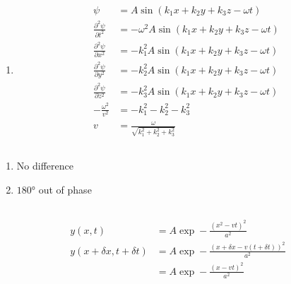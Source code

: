 \documentclass{article}
\begin{document}
\begin{enumerate}
  \item

        \begin{align*}
          \psi                                 & = A \sin (k_1 x + k_2 y + k_3 z - \omega t)           \\
          \frac{\partial^2 \psi}{\partial t^2} & = -\omega^2 A \sin (k_1 x + k_2 y + k_3 z - \omega t) \\
          \frac{\partial^2 \psi}{\partial x^2} & = -k_1^2 A \sin (k_1 x + k_2 y + k_3 z - \omega t)    \\
          \frac{\partial^2 \psi}{\partial y^2} & = -k_2^2 A \sin (k_1 x + k_2 y + k_3 z - \omega t)    \\
          \frac{\partial^2 \psi}{\partial z^2} & = -k_3^2 A \sin (k_1 x + k_2 y + k_3 z - \omega t)    \\
          -\frac{\omega^2}{v^2}                & = -k_1^2 - k_2^2 - k_3^2                              \\
          v                                    & = \frac{\omega}{\sqrt{k_1^2 + k_2^2 + k_3^2}}
        \end{align*}
\end{enumerate}

\subsection{}

\begin{enumerate}
  \item No difference

  \item $\ang{180}$ out of phase
\end{enumerate}

\subsection{}

\begin{align*}
  y(x, t)                       & = A \exp -\frac{(x^2 - v t)^2}{a^2}                       \\
  y(x + \delta x, t + \delta t) & = A \exp -\frac{(x + \delta x - v (t + \delta t))^2}{a^2} \\
                                & = A \exp -\frac{(x - v t)^2}{a^2}
\end{align*}

\subsection{}
\end{document}
